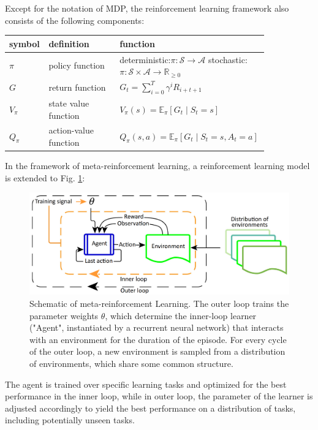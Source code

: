 \par
Except for the notation of MDP, the reinforcement learning framework also consists of the following components:

\begin{center}
	\begin{tabular}{| p{0.12\linewidth} | p{0.27\linewidth} | p{0.45\linewidth} |}
		\hline
		\textbf{symbol} & \textbf{definition} & \textbf{function} \\
		\hline
		$\pi$ & policy function & deterministic:\newline $\pi: \mathcal{S} \rightarrow \mathcal{A}$ \newline stochastic:\newline $\pi: \mathcal{S} \times \mathcal{A} \rightarrow \mathbb{R}_{\geq 0}$\\ 
		\hline
		$G$ & return function & $G_{t} = \sum_{i=0}^{T}\gamma^i R_{i+t+1}$ \\ 
		\hline 
		$V_{\pi}$ & state value function & $V_{\pi}(s)=\mathbb{E}_{\pi}\left[G_{t} \mid S_{t}=s\right]$\\
		\hline 
		$Q_{\pi}$ & action-value function & $Q_{\pi}(s, a)=\mathbb{E}_{\pi}\left[G_{t} \mid S_{t}=s, A_{t}=a\right]$ \\
		\hline 
	\end{tabular}
\end{center}

\par
In the framework of meta-reinforcement learning, a reinforcement learning model is extended to Fig. \ref{meta-model}:

\begin{figure}[H]
	\includegraphics[scale=0.35]{meta-rl.png}
	\centering
	\caption{Schematic of meta-reinforcement Learning. The outer loop trains the parameter weights $\theta$, which determine the inner-loop learner ("Agent", instantiated by a recurrent neural network) that interacts with an environment for the duration of the episode. For every cycle of the outer loop, a new environment is sampled from a distribution of environments, which share some common structure\cite{meta-model}.}
	\label{meta-model}
\end{figure}

The agent is trained over specific learning tasks and optimized for the best performance in the inner loop, while in outer loop, the parameter of the learner is adjusted accordingly to yield the best performance on a distribution of tasks, including potentially unseen tasks.